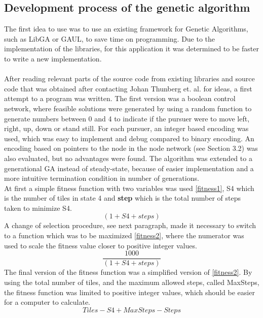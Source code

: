 \subsection{Development process of the genetic algorithm}
The first idea to use  was to use an existing framework for Genetic Algorithms, such as LibGA \cite{libGA} or GAUL\cite{GAUL}, to save time on programming. Due to the implementation of the libraries, for this application it was determined to be faster to write a new implementation.\\
\\After reading relevant parts of the source code from existing libraries and source code that was obtained after contacting Johan Thunberg et. al. for ideas, a first attempt to a program was written. The first version was a boolean control network, where feasible solutions were generated by using a random function to generate numbers between 0 and 4 to indicate if the pursuer were to move left, right, up, down or stand still. For each pursuer, an integer based encoding was used, which was easy to implement and debug compared to binary encoding. An encoding based on pointers to the node in the node network (see Section 3.2) was also evaluated, but no advantages were found. The algorithm was extended to a generational GA instead of steady-state, because of easier implementation and a more intuitive termination condition in number of generations.\\
At first a simple fitness function with two variables was used \eqref{fitness1}, S4 which is the number of tiles in state 4 and \textbf{step} which is the total number of steps taken to minimize S4.
\begin{equation}\label{fitness1} (1+S4+steps) \end{equation}
A change of selection procedure, see next paragraph, made it necessary to switch to a function which was to be maximized \eqref{fitness2},  where the numerator was used to scale the fitness value closer to positive integer values.
\begin{equation}\label{fitness2} \frac{1000}{(1+S4+steps)} \end{equation}
The final version of the fitness function was a simplified version of \eqref{fitness2}. By using the total number of tiles, and the maximum allowed steps, called MaxSteps, the fitness function was limited to positive integer values, which should be easier for a computer to calculate.
\begin{equation} \label{fitness3}Tiles-S4+MaxSteps-Steps \end{equation}
